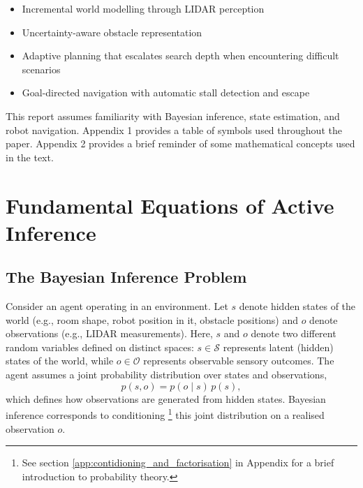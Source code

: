 \documentclass[a4paper, twoside]{article}
\begin{document}
\begin{itemize}
    \item Incremental world modelling through LIDAR perception
    \item Uncertainty-aware obstacle representation
    \item Adaptive planning that escalates search depth when encountering difficult scenarios
    \item Goal-directed navigation with automatic stall detection and escape
\end{itemize}



This report assumes familiarity with Bayesian inference, state estimation, and robot navigation. Appendix 1 provides a table of symbols used throughout the paper. Appendix 2 provides a brief reminder of some mathematical concepts used in the text.


\section{Fundamental Equations of Active Inference}
\subsection{The Bayesian Inference Problem}

Consider an agent operating in an environment.
Let $s$ denote hidden states of the world (e.g., room shape, robot position in it,  obstacle positions) and $o$ denote observations (e.g., LIDAR measurements).
Here, $s$ and $o$ denote two different random variables defined on distinct
spaces: $s \in \mathcal{S}$ represents latent (hidden) states of the world,
while $o \in \mathcal{O}$ represents observable sensory outcomes. The agent
assumes a joint probability distribution over states and observations,
\[
p(s,o) = p(o \mid s)\,p(s),
\]
which defines how observations are generated from hidden states. Bayesian
inference corresponds to conditioning \footnote{See section \ref{app:contidioning_and_factorisation} in Appendix for a brief introduction to probability theory.} this joint distribution on a realised
observation $o$.
\end{document}
